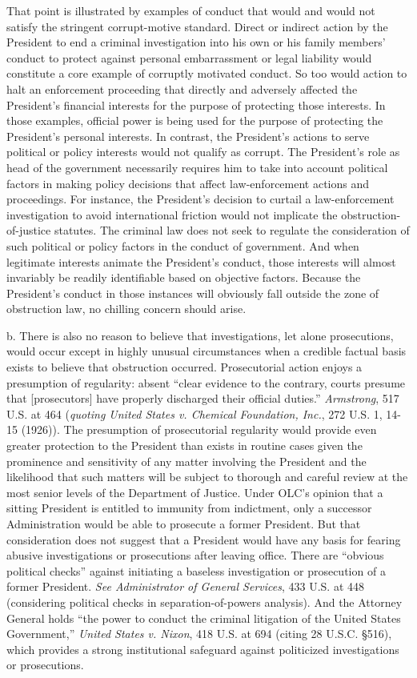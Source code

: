 That point is illustrated by examples of conduct that would and would not satisfy the stringent corrupt-motive standard.
Direct or indirect action by the President to end a criminal investigation into his own or his family members’ conduct to protect against personal embarrassment or legal liability would constitute a core example of corruptly motivated conduct.
So too would action to halt an enforcement proceeding that directly and adversely affected the President’s financial interests for the purpose of protecting those interests.
In those examples, official power is being used for the purpose of protecting the President’s personal interests.
In contrast, the President’s actions to serve political or policy interests would not qualify as corrupt.
The President’s role as head of the government necessarily requires him to take into account political factors in making policy decisions that affect law-enforcement actions and proceedings.
For instance, the President’s decision to curtail a law-enforcement investigation to avoid international friction would not implicate the obstruction-of-justice statutes.
The criminal law does not seek to regulate the consideration of such political or policy factors in the conduct of government.
And when legitimate interests animate the President’s conduct, those interests will almost invariably be readily identifiable based on objective factors.
Because the President’s conduct in those instances will obviously fall outside the zone of obstruction law, no chilling concern should arise.

b. There is also no reason to believe that investigations, let alone prosecutions, would occur except in highly unusual circumstances when a credible factual basis exists to believe that obstruction occurred.
Prosecutorial action enjoys a presumption of regularity: absent “clear evidence to the contrary, courts presume that [prosecutors] have properly discharged their official duties.”
\textit{Armstrong}, 517 U.S. at 464 (\textit{quoting United States v. Chemical Foundation, Inc.}, 272 U.S. 1, 14-15 (1926)).
The presumption of prosecutorial regularity would provide even greater protection to the President than exists in routine cases given the prominence and sensitivity of any matter involving the President and the likelihood that such matters will be subject to thorough and careful review at the most senior levels of the Department of Justice.
Under OLC’s opinion that a sitting President is entitled to immunity from indictment, only a successor Administration would be able to prosecute a former President.
But that consideration does not suggest that a President would have any basis for fearing abusive investigations or prosecutions after leaving office.
There are “obvious political checks” against initiating a baseless investigation or prosecution of a former President.
\textit{See Administrator of General Services}, 433 U.S. at 448 (considering political checks in separation-of-powers analysis).
And the Attorney General holds “the power to conduct the criminal litigation of the United States Government,” \textit{United States v. Nixon}, 418 U.S. at 694 (citing 28 U.S.C. \S 516), which provides a strong institutional safeguard against politicized investigations or prosecutions.%

